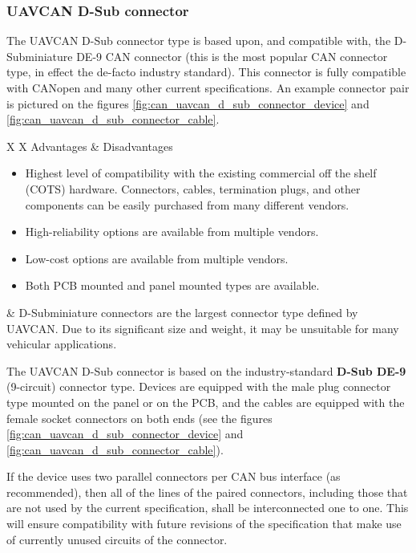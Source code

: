 \clearpage  %
\subsubsection{UAVCAN D-Sub connector}

The UAVCAN D-Sub connector type is based upon, and compatible with, the D-Subminiature DE-9 CAN connector
(this is the most popular CAN connector type, in effect the de-facto industry standard).
This connector is fully compatible with CANopen and many other current specifications.
An example connector pair is pictured on the figures \ref{fig:can_uavcan_d_sub_connector_device}
and \ref{fig:can_uavcan_d_sub_connector_cable}.

{
\NoLeftSkip
\begin{UAVCANCompactTable}{X X}
    Advantages & Disadvantages \\
    \begin{itemize}
        \item Highest level of compatibility with the existing commercial off the shelf (COTS) hardware.
        Connectors, cables, termination plugs, and other components can be easily purchased from many different vendors.
        \item High-reliability options are available from multiple vendors.
        \item Low-cost options are available from multiple vendors.
        \item Both PCB mounted and panel mounted types are available.
    \end{itemize}
    &
    D-Subminiature connectors are the largest connector type defined by UAVCAN.
    Due to its significant size and weight, it may be unsuitable for many vehicular applications.
\end{UAVCANCompactTable}
}

The UAVCAN D-Sub connector is based on the industry-standard \textbf{D-Sub DE-9} (9-circuit) connector type.
Devices are equipped with the male plug connector type mounted on the panel or on the PCB,
and the cables are equipped with the female socket connectors on both ends
(see the figures \ref{fig:can_uavcan_d_sub_connector_device} and \ref{fig:can_uavcan_d_sub_connector_cable}).

If the device uses two parallel connectors per CAN bus interface (as recommended),
then all of the lines of the paired connectors,
including those that are not used by the current specification,
shall be interconnected one to one.
This will ensure compatibility with future revisions of the specification that make use of
currently unused circuits of the connector.

